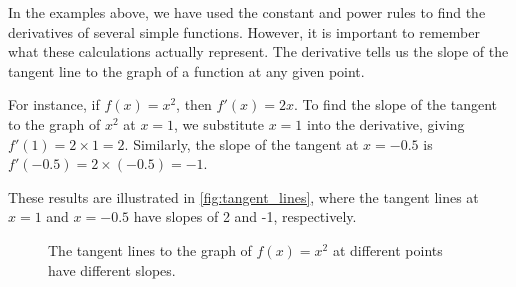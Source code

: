 In the examples above, we have used the constant and power rules to find the derivatives of several simple functions. However, it is important to remember what these calculations actually represent. The derivative tells us the slope of the tangent line to the graph of a function at any given point.

For instance, if $f(x) = x^{2}$, then $f'(x) = 2x$. To find the slope of the tangent to the graph of $x^{2}$ at $x = 1$, we substitute $x = 1$ into the derivative, giving $f'(1) = 2 \times 1 = 2$. Similarly, the slope of the tangent at $x = -0.5$ is $f'(-0.5) = 2 \times (-0.5) = -1$.

These results are illustrated in \autoref{fig:tangent_lines}, where the tangent lines at $x = 1$ and $x = -0.5$ have slopes of 2 and -1, respectively.



\begin{figure}[htbp]
    \centering
    \caption{The tangent lines to the graph of \(f(x) = x^2\) at different points have different slopes.}
    \label{fig:tangent_lines}
\end{figure}


